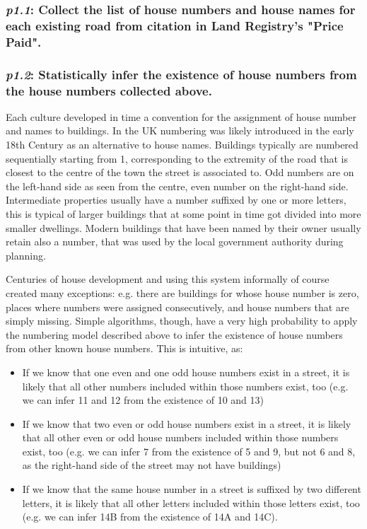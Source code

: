     \subsubsection{{\it p1.1}: Collect the list of house numbers and house names for each existing road from citation in Land Registry's "Price Paid".} 

        

    \subsubsection{{\it p1.2}: Statistically infer the existence of house numbers from the house numbers collected above.} 

        Each culture developed in time a convention for the assignment of house number and names to buildings. In the UK numbering was likely introduced in the early 18th Century as an alternative to house names. Buildings typically are numbered sequentially starting from 1, corresponding to the extremity of the road that is closest to the centre of the town the street is associated to. Odd numbers are on the left-hand side as seen from the centre, even number on the right-hand side. Intermediate properties usually have a number suffixed by one or more letters, this is typical of larger buildings that at some point in time got divided into more smaller dwellings. Modern buildings that have been named by their owner usually retain also a number, that was used by the local government authority during planning.
        
        Centuries of house development and using this system informally of course created many exceptions: e.g. there are buildings for whose house number is zero, places where numbers were assigned consecutively, and house numbers that are simply missing. Simple algorithms, though, have a very high probability to apply the numbering model described above to infer the existence of house numbers from other known house numbers. This is intuitive, as: 
        \begin{itemize}
            \item If we know that one even and one odd house numbers exist in a street, it is likely that all other numbers included within those numbers exist, too (e.g. we can infer 11 and 12 from the existence of 10 and 13)
            \item If we know that two even or odd house numbers exist in a street, it is likely that all other even or odd house numbers included within those numbers exist, too (e.g. we can infer 7 from the existence of 5 and 9, but not 6 and 8, as the right-hand side of the street may not have buildings)
            \item If we know that the same house number in a street is suffixed by two different letters, it is likely that all other letters included within those letters exist, too (e.g. we can infer 14B from the existence of 14A and 14C).
        \end{itemize}
        
